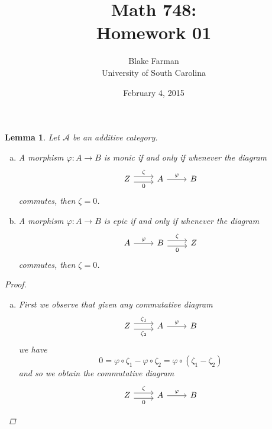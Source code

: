 \documentclass[10pt]{amsart}
\author{Blake Farman\\University of South Carolina}
\title{Math 748:\\Homework 01}
\date{February 4, 2015}
\begin{document}
\maketitle

\providecommand{\p}{\mathfrak{p}}
\providecommand{\m}{\mathfrak{m}}
\providecommand{\Deck}[1]{\operatorname{Deck}\left(#1\right)}
\newtheorem{thm}{}
\newtheorem{lem}{Lemma}
\newtheorem{prop}{Proposition}
\theoremstyle{definition}
\newtheorem{defn}{Definition}[thm]

\newcommand{\A}{\mathbb{A}}
\newcommand{\coker}{\operatorname{coker}}
\newcommand{\cone}[1]{\operatorname{cone}\left(#1\right)}

\begin{lem}\label{lem1}
  Let $\mathcal{A}$ be an additive category.
  \begin{enumerate}[(a)]
  \item
    A morphism $\varphi: A \rightarrow B$ is monic if and only if whenever the diagram
    $$\begin{tikzcd}
      Z \arrow[shift left = 0.75ex]{r}{\zeta} \arrow[shift right=0.75ex, swap]{r}{0}& A\arrow{r}{\varphi} & B
    \end{tikzcd}
    $$
    commutes, then $\zeta = 0$.
  \item
    A morphism $\varphi: A \rightarrow B$ is epic if and only if whenever the diagram
    $$\begin{tikzcd}
      A\arrow{r}{\varphi} & B \arrow[shift left = 0.75ex]{r}{\zeta} \arrow[shift right=0.75ex, swap]{r}{0} & Z
    \end{tikzcd}
    $$
    commutes, then $\zeta = 0$.
  \end{enumerate}
  \begin{proof}
    \begin{enumerate}[(a)]
    \item
      First we observe that given any commutative diagram
      $$\begin{tikzcd}
	Z \arrow[shift left = 0.75ex]{r}{\zeta_1} \arrow[shift right=0.75ex, swap]{r}{\zeta_2}& A\arrow{r}{\varphi} & B
      \end{tikzcd}$$
      we have
      $$0 = \varphi \circ \zeta_1 - \varphi \circ \zeta_2 = \varphi \circ (\zeta_1 - \zeta_2)$$
      and so we obtain the commutative diagram
      $$\begin{tikzcd}
	Z \arrow[shift left = 0.75ex]{r}{\zeta} \arrow[shift right=0.75ex, swap]{r}{0}& A\arrow{r}{\varphi} & B
      \end{tikzcd}$$

\end{enumerate}
\end{proof}
\end{lem}
\end{document}
